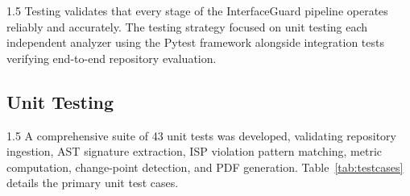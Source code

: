 \documentclass[12pt,a4paper]{article}
\begin{document}
\begin{spacing}{1.5}
\justifying
Testing validates that every stage of the InterfaceGuard pipeline operates reliably and accurately. The testing strategy focused on unit testing each independent analyzer using the Pytest framework alongside integration tests verifying end-to-end repository evaluation.
\end{spacing}

\subsection{Unit Testing}

\begin{spacing}{1.5}
\justifying
A comprehensive suite of 43 unit tests was developed, validating repository ingestion, AST signature extraction, ISP violation pattern matching, metric computation, change-point detection, and PDF generation. Table~\ref{tab:testcases} details the primary unit test cases.
\end{spacing}
\end{document}
